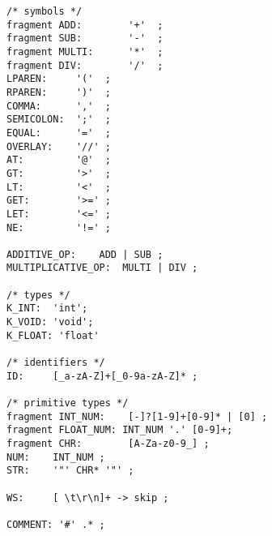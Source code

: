 \documentclass[11pt,letterpaper]{article}
\begin{document}
\begin{lstlisting}[tabsize=2]
/* symbols */
fragment ADD:        '+'  ;
fragment SUB:        '-'  ;
fragment MULTI:      '*'  ;
fragment DIV:        '/'  ;
LPAREN:     '('  ;
RPAREN:     ')'  ;
COMMA:      ','  ;
SEMICOLON:  ';'  ;
EQUAL:      '='  ;
OVERLAY:    '//' ;
AT:         '@'  ;
GT:         '>'  ;
LT:         '<'  ;
GET:        '>=' ;
LET:        '<=' ;
NE:         '!=' ;

ADDITIVE_OP:    ADD | SUB ;
MULTIPLICATIVE_OP:  MULTI | DIV ;

/* types */
K_INT:  'int';
K_VOID: 'void';
K_FLOAT: 'float'

/* identifiers */
ID:     [_a-zA-Z]+[_0-9a-zA-Z]* ;   

/* primitive types */
fragment INT_NUM:    [-]?[1-9]+[0-9]* | [0] ;    
fragment FLOAT_NUM: INT_NUM '.' [0-9]+; 
fragment CHR:        [A-Za-z0-9_] ;
NUM:    INT_NUM ;
STR:    '"' CHR* '"' ;

WS:     [ \t\r\n]+ -> skip ;

COMMENT: '#' .* ;
\end{lstlisting}	
\end{document}
